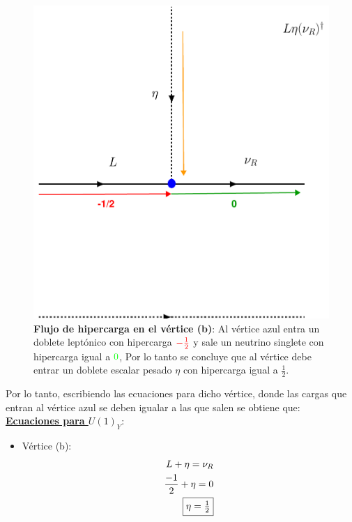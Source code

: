 \documentclass[12pt]{article}
\begin{document}
\begin{figure}[h!]
  \begin{center}
  \includegraphics[scale=0.6]{Flujohyer(a).pdf}
\caption{{\textbf{Flujo de hipercarga en el vértice (b)}: Al vértice azul entra un doblete leptónico con hipercarga $\color{red}
-\frac{1}{2}$ y sale un neutrino singlete con hipercarga igual a $\color{green} 0 $, Por lo tanto se concluye que al vértice debe entrar un doblete escalar pesado $\eta$ con hipercarga igual a $ \frac{1}{2}$.}}
\label{fig:Hypercharge(a)}
\end{center}
\end{figure}

Por lo tanto, escribiendo las ecuaciones para dicho vértice, donde las cargas que entran al vértice azul se deben igualar a las que salen se obtiene que: \\

     \underline{\textbf{Ecuaciones para $U(1)_Y$}}:  
\begin{itemize}
    \item Vértice (b):
    \begin{equation}
    \label{eq:eqforhypercharge}
    \begin{aligned}
            L+\eta=\nu_R \\
            \frac{-1}{2} + \eta = 0 \\
            \fbox{$ \eta=\frac{1}{2}$}
    \end{aligned}
    \end{equation}
\end{itemize}
\end{document}
